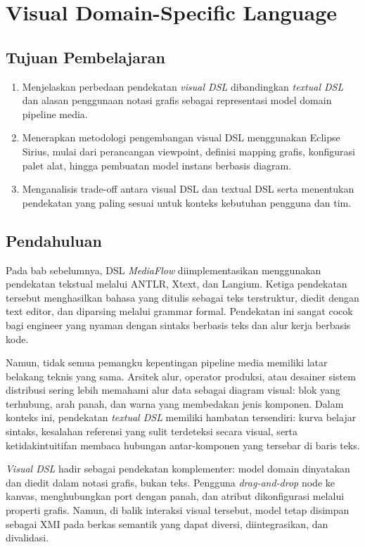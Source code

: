 \chapter{Visual Domain-Specific Language}
\label{chap:dsl-visual}

\section*{Tujuan Pembelajaran}
\begin{enumerate}
  \item Menjelaskan perbedaan pendekatan \textit{visual DSL} dibandingkan \textit{textual DSL} dan alasan penggunaan notasi grafis sebagai representasi model domain pipeline media.
  \item Menerapkan metodologi pengembangan visual DSL menggunakan Eclipse Sirius, mulai dari perancangan viewpoint, definisi mapping grafis, konfigurasi palet alat, hingga pembuatan model instans berbasis diagram.
  \item Menganalisis trade-off antara visual DSL dan textual DSL serta menentukan pendekatan yang paling sesuai untuk konteks kebutuhan pengguna dan tim.
\end{enumerate}

\section{Pendahuluan}

Pada bab sebelumnya, DSL \textit{MediaFlow} diimplementasikan menggunakan pendekatan tekstual melalui ANTLR, Xtext, dan Langium. Ketiga pendekatan tersebut menghasilkan bahasa yang ditulis sebagai teks terstruktur, diedit dengan text editor, dan diparsing melalui grammar formal. Pendekatan ini sangat cocok bagi engineer yang nyaman dengan sintaks berbasis teks dan alur kerja berbasis kode.

Namun, tidak semua pemangku kepentingan pipeline media memiliki latar belakang teknis yang sama. Arsitek alur, operator produksi, atau desainer sistem distribusi sering lebih memahami alur data sebagai diagram visual: blok yang terhubung, arah panah, dan warna yang membedakan jenis komponen. Dalam konteks ini, pendekatan \textit{textual DSL} memiliki hambatan tersendiri: kurva belajar sintaks, kesalahan referensi yang sulit terdeteksi secara visual, serta ketidakintuitifan membaca hubungan antar-komponen yang tersebar di baris teks.

\textit{Visual DSL} hadir sebagai pendekatan komplementer: model domain dinyatakan dan diedit dalam notasi grafis, bukan teks. Pengguna \textit{drag-and-drop} node ke kanvas, menghubungkan port dengan panah, dan atribut dikonfigurasi melalui properti grafis. Namun, di balik interaksi visual tersebut, model tetap disimpan sebagai XMI pada berkas semantik yang dapat diversi, diintegrasikan, dan divalidasi.

